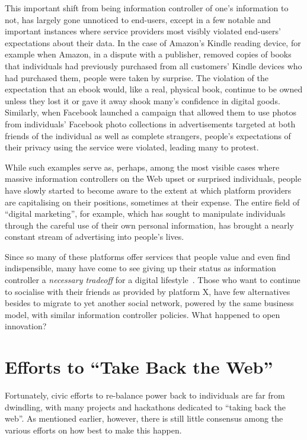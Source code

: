 \documentclass{amsart}
\begin{document}
This important shift from being information controller of one's information to not, has largely gone unnoticed to end-users, except in a few notable and important instances where service providers most visibly violated end-users' expectations about their data.  In the case of Amazon's Kindle reading device, for example when Amazon, in a dispute with a publisher, removed copies of books that individuals had previously purchased from all customers' Kindle devices who had purchased them, people were taken by surprise.  The violation of the expectation that an ebook would, like a real, physical book, continue to be owned unless they lost it or gave it away shook many's confidence in digital goods.   Similarly, when Facebook launched a campaign that allowed them to use photos from individuals' Facebook photo collections in advertisements targeted at both friends of the individual as well as complete strangers, people's expectations of their privacy using the service were violated, leading many to protest.

While such examples serve as, perhaps, among the most visible cases where massive information controllers on the Web upset or surprised individuals,  people have slowly started to become aware to the extent at which platform providers are capitalising on their positions, sometimes at their expense.  The entire field of ``digital marketing'', for example, which has sought to manipulate individuals through the careful use of their own personal information, has brought a nearly constant stream of advertising into people's lives.  

Since so many of these platforms offer services that people value and even find indispensible, many have come to see giving up their status as information controller a \emph{necessary tradeoff} for a digital lifestyle~\cite{}. Those who want to continue to socialise with their friends as provided by platform X, have few alternatives besides to migrate to yet another social network, powered by the same business model, with similar information controller policies.  What happened to open innovation? 

\section{Efforts to ``Take Back the Web''}

Fortunately, civic efforts to re-balance power back to individuals are far from dwindling, with many projects and hackathons dedicated to ``taking back the web''.  As mentioned earlier, however, there is still little consensus among the various efforts on how best to make this happen.  
\end{document}
